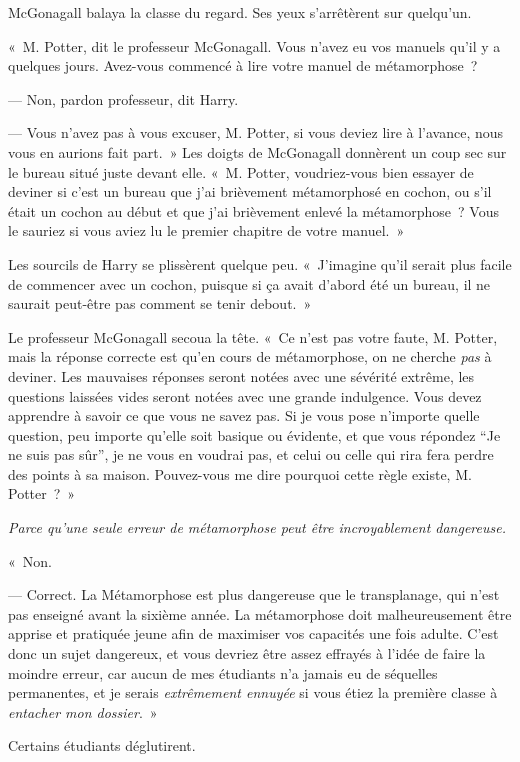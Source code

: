 McGonagall balaya la classe du regard. Ses yeux s'arrêtèrent sur quelqu'un.

«~M. Potter, dit le professeur McGonagall. Vous n'avez eu vos manuels qu'il y a quelques jours. Avez-vous commencé à lire votre manuel de métamorphose~?

--- Non, pardon professeur, dit Harry.

--- Vous n'avez pas à vous excuser, M. Potter, si vous deviez lire à l'avance, nous vous en aurions fait part.~» Les doigts de McGonagall donnèrent un coup sec sur le bureau situé juste devant elle. «~M. Potter, voudriez-vous bien essayer de deviner si c'est un bureau que j'ai brièvement métamorphosé en cochon, ou s'il était un cochon au début et que j'ai brièvement enlevé la métamorphose~? Vous le sauriez si vous aviez lu le premier chapitre de votre manuel.~»

Les sourcils de Harry se plissèrent quelque peu. «~J'imagine qu'il serait plus facile de commencer avec un cochon, puisque si ça avait d'abord été un bureau, il ne saurait peut-être pas comment se tenir debout.~»

Le professeur McGonagall secoua la tête. «~Ce n'est pas votre faute, M. Potter, mais la réponse correcte est qu'en cours de métamorphose, on ne cherche \emph{pas} à deviner. Les mauvaises réponses seront notées avec une sévérité extrême, les questions laissées vides seront notées avec une grande indulgence. Vous devez apprendre à savoir ce que vous ne savez pas. Si je vous pose n'importe quelle question, peu importe qu'elle soit basique ou évidente, et que vous répondez “Je ne suis pas sûr”, je ne vous en voudrai pas, et celui ou celle qui rira fera perdre des points à sa maison. Pouvez-vous me dire pourquoi cette règle existe, M. Potter~?~»

\emph{Parce qu'une seule erreur de métamorphose peut être incroyablement dangereuse.}

«~Non.

--- Correct. La Métamorphose est plus dangereuse que le transplanage, qui n'est pas enseigné avant la sixième année. La métamorphose doit malheureusement être apprise et pratiquée jeune afin de maximiser vos capacités une fois adulte. C'est donc un sujet dangereux, et vous devriez être assez effrayés à l'idée de faire la moindre erreur, car aucun de mes étudiants n'a jamais eu de séquelles permanentes, et je serais \emph{extrêmement ennuyée} si vous étiez la première classe à \emph{entacher mon dossier}.~»

Certains étudiants déglutirent.

